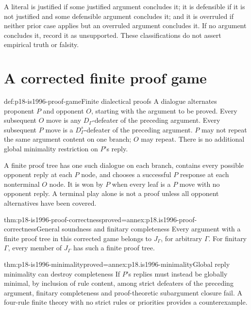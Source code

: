 A literal is justified if some justified argument concludes it;
it is defensible if it is not justified and some defensible
argument concludes it; and it is overruled if neither prior
case applies but an overruled argument concludes it.
If no argument concludes it, record it as unsupported.
These classifications do not assert empirical truth or falsity.

\section{A corrected finite proof game}

\begin{hbdefinition}{def:p18-is1996-proof-game}{Finite dialectical proofs}
A dialogue alternates proponent \(P\) and opponent \(O\),
starting with the argument to be proved.
Every subsequent \(O\) move is any \(D_\Gamma\)-defeater
of the preceding argument. Every subsequent \(P\) move is
a \(D_\Gamma^s\)-defeater of the preceding argument.
\(P\) may not repeat the same argument content on one branch;
\(O\) may repeat.
There is no additional global minimality restriction on \(P\)'s reply.

A finite proof tree has one such dialogue on each branch,
contains every possible opponent reply at each \(P\) node,
and chooses a successful \(P\) response at each nonterminal
\(O\) node. It is won by \(P\) when every leaf is a \(P\) move
with no opponent reply. A terminal play alone is not a proof
unless all opponent alternatives have been covered.
\end{hbdefinition}

\begin{hbtheorem}{thm:p18-is1996-proof-correctness}{proved=annex:p18.is1996-proof-correctness}{General soundness and finitary completeness}
Every argument with a finite proof tree in this corrected game
belongs to \(J_\Gamma\), for arbitrary \(\Gamma\).
For finitary \(\Gamma\), every member of \(J_\Gamma\) has
such a finite proof tree.
\end{hbtheorem}

\begin{hbtheorem}{thm:p18-is1996-minimality}{proved=annex:p18.is1996-minimality}{Global reply minimality can destroy completeness}
If \(P\)'s replies must instead be globally minimal, by inclusion
of rule content, among strict defeaters of the preceding argument,
finitary completeness and proof-theoretic subargument closure fail.
A four-rule finite theory with no strict rules or priorities
provides a counterexample.
\end{hbtheorem}

